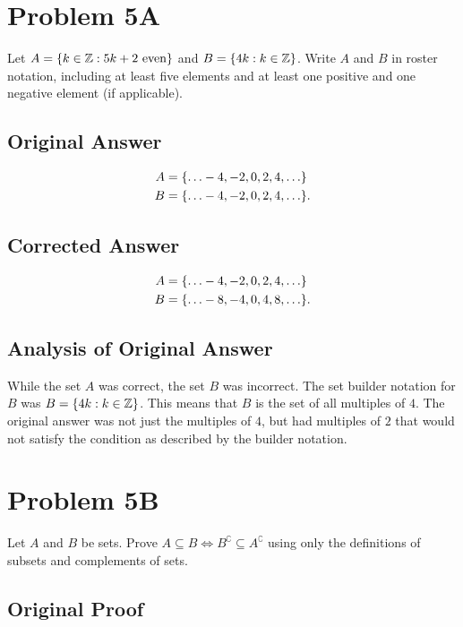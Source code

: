 \documentclass[12pt]{extarticle}
\begin{document}
\section*{Problem $\mathbf{5}$A}

Let $A = \qty{k \in \mathbb{Z}: 5k+ 2 \text{ even}}$ and $B = \qty{4k: k \in \mathbb{Z}}$. Write $A$ and $B$ in roster notation, including at least five elements and at least one positive and one negative element (if applicable).

\subsection*{Original Answer}

\begin{align*}
	A &= \qty{\ldots -4, -2, 0, 2, 4, \ldots} \\
	B &= \qty{\ldots -4, -2, 0, 2, 4, \ldots}
.\end{align*}

\subsection*{Corrected Answer}

\begin{align*}
	A &= \qty{\ldots -4, -2, 0, 2, 4, \ldots} \\
	B &= \qty{\ldots -8, -4, 0, 4, 8, \ldots}
.\end{align*}

\subsection*{Analysis of Original Answer}

While the set $A$ was correct, the set $B$ was incorrect. The set builder notation for $B$ was $B = \qty{4k : k \in \mathbb{Z}}$. This means that $B$ is the set of all multiples of $4$. The original answer was not just the multiples of $4$, but had multiples of $2$ that would not satisfy the condition as described by the builder notation.

\section*{Problem $\mathbf{5}$B}

Let $A$ and $B$ be sets. Prove $A \subseteq B \Longleftrightarrow B^\complement \subseteq A^\complement$ using only the definitions of subsets and complements of sets.

\subsection*{Original Proof}
\end{document}
